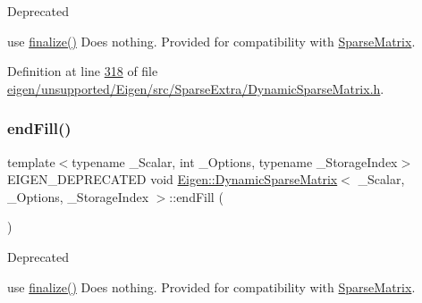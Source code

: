 \begin{DoxyRefDesc}{Deprecated}
\item[\hyperlink{deprecated__deprecated000044}{Deprecated}]use \hyperlink{class_eigen_1_1_dynamic_sparse_matrix_aa0abc0e4565143f103f0d7373bd4a125}{finalize()} Does nothing. Provided for compatibility with \hyperlink{group___sparse_core___module_class_eigen_1_1_sparse_matrix}{Sparse\+Matrix}. \end{DoxyRefDesc}


Definition at line \hyperlink{eigen_2unsupported_2_eigen_2src_2_sparse_extra_2_dynamic_sparse_matrix_8h_source_l00318}{318} of file \hyperlink{eigen_2unsupported_2_eigen_2src_2_sparse_extra_2_dynamic_sparse_matrix_8h_source}{eigen/unsupported/\+Eigen/src/\+Sparse\+Extra/\+Dynamic\+Sparse\+Matrix.\+h}.

\mbox{\label{class_eigen_1_1_dynamic_sparse_matrix_aa806b3dde0a055844110610907b016f3}} 
\subsubsection{\texorpdfstring{end\+Fill()}{endFill()}\hspace{0.1cm}{\footnotesize\ttfamily [2/2]}}
{\footnotesize\ttfamily template$<$typename \+\_\+\+Scalar, int \+\_\+\+Options, typename \+\_\+\+Storage\+Index$>$ \\
E\+I\+G\+E\+N\+\_\+\+D\+E\+P\+R\+E\+C\+A\+T\+ED void \hyperlink{class_eigen_1_1_dynamic_sparse_matrix}{Eigen\+::\+Dynamic\+Sparse\+Matrix}$<$ \+\_\+\+Scalar, \+\_\+\+Options, \+\_\+\+Storage\+Index $>$\+::end\+Fill (\begin{DoxyParamCaption}{ }\end{DoxyParamCaption})\hspace{0.3cm}{\ttfamily [inline]}}

\begin{DoxyRefDesc}{Deprecated}
\item[\hyperlink{deprecated__deprecated000088}{Deprecated}]use \hyperlink{class_eigen_1_1_dynamic_sparse_matrix_aa0abc0e4565143f103f0d7373bd4a125}{finalize()} Does nothing. Provided for compatibility with \hyperlink{group___sparse_core___module_class_eigen_1_1_sparse_matrix}{Sparse\+Matrix}. \end{DoxyRefDesc}


